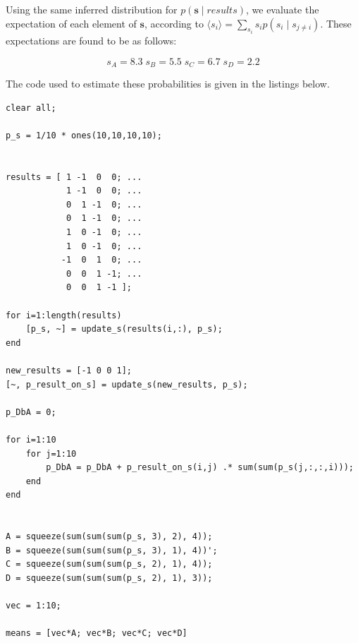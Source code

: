\documentclass[11pt,a4paper,oneside]{report}
\begin{document}
Using the same inferred distribution for $p(\mathbf{s} \; | \; results)$, we
evaluate the expectation of each element of $\mathbf{s}$, according to
$\langle s_i \rangle = \sum_{s_i} s_i p(s_i \; | \; s_{j \neq i})$.
These expectations are found to be as follows:

\begin{equation}
s_A  = 8.3 \; s_B = 5.5 \; s_C = 6.7 \; s_D = 2.2
\end{equation}

The code used to estimate these probabilities is given in the listings below.

\begin{lstlisting}
clear all;

p_s = 1/10 * ones(10,10,10,10);


results = [ 1 -1  0  0; ...
            1 -1  0  0; ...
            0  1 -1  0; ...
            0  1 -1  0; ...
            1  0 -1  0; ...
            1  0 -1  0; ...
           -1  0  1  0; ...
            0  0  1 -1; ...
            0  0  1 -1 ];
        
for i=1:length(results)
    [p_s, ~] = update_s(results(i,:), p_s);
end

new_results = [-1 0 0 1];
[~, p_result_on_s] = update_s(new_results, p_s);

p_DbA = 0;

for i=1:10
    for j=1:10
        p_DbA = p_DbA + p_result_on_s(i,j) .* sum(sum(p_s(j,:,:,i)));
    end
end


A = squeeze(sum(sum(sum(p_s, 3), 2), 4));
B = squeeze(sum(sum(sum(p_s, 3), 1), 4))';
C = squeeze(sum(sum(sum(p_s, 2), 1), 4));
D = squeeze(sum(sum(sum(p_s, 2), 1), 3));

vec = 1:10;

means = [vec*A; vec*B; vec*C; vec*D]
\end{lstlisting}
\end{document}
